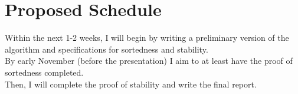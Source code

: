 \documentclass[10pt]{article}
\begin{document}
\section{Proposed Schedule}
Within the next 1-2 weeks, I will begin by writing a preliminary version of the algorithm and specifications for sortedness and stability.
\\By early November (before the presentation) I aim to at least have the proof of sortedness completed.
\\Then, I will complete the proof of stability and write the final report.
\end{document}
